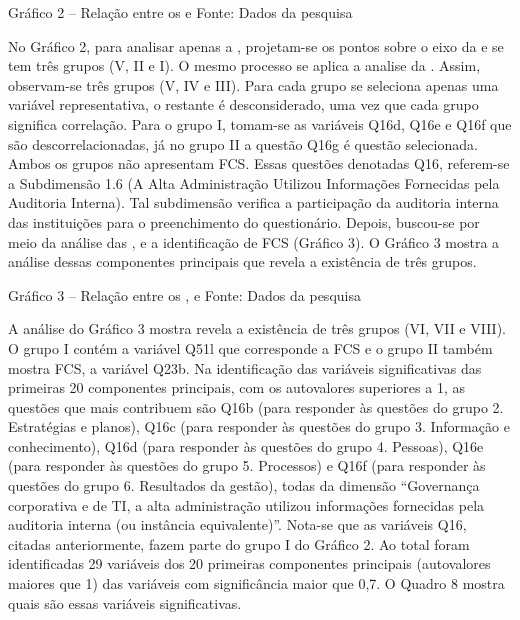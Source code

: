 Gráfico 2 – Relação entre os  e  
Fonte: Dados da pesquisa

No Gráfico 2, para analisar apenas a , projetam-se os pontos sobre o eixo da e se tem três grupos (V, II e I). O mesmo processo se aplica a analise da . Assim, observam-se três grupos (V, IV e III). Para cada grupo se seleciona apenas uma variável representativa, o restante é desconsiderado, uma vez que cada grupo significa correlação.
Para o grupo I, tomam-se as variáveis Q16d, Q16e e Q16f que são descorrelacionadas, já no grupo II a questão Q16g é questão selecionada. Ambos os grupos não apresentam FCS. Essas questões denotadas Q16, referem-se a Subdimensão 1.6 (A Alta Administração Utilizou Informações Fornecidas pela Auditoria Interna). Tal subdimensão verifica a participação da auditoria interna das instituições para o preenchimento do questionário. 
Depois, buscou-se por meio da análise das ,  e a identificação de FCS (Gráfico 3). O Gráfico 3 mostra a análise dessas componentes principais que revela a existência de três grupos. 

Gráfico 3 – Relação entre os ,  e 
Fonte: Dados da pesquisa

A análise do Gráfico 3 mostra revela a existência de três grupos (VI, VII e VIII). O grupo I contém a variável Q51l que corresponde a FCS e o grupo II também mostra FCS, a variável Q23b.
Na identificação das variáveis significativas das primeiras 20 componentes principais, com os autovalores superiores a 1, as questões que mais contribuem são Q16b (para responder às questões do grupo 2. Estratégias e planos), Q16c (para responder às questões do grupo 3. Informação e conhecimento), Q16d (para responder às questões do grupo 4. Pessoas), Q16e (para responder às questões do grupo 5. Processos) e Q16f (para responder às questões do grupo 6. Resultados da gestão), todas da dimensão “Governança corporativa e de TI, a alta administração utilizou informações fornecidas pela auditoria interna (ou instância equivalente)”. Nota-se que as variáveis Q16, citadas anteriormente, fazem parte do grupo I do Gráfico 2. Ao total foram identificadas 29 variáveis dos 20 primeiras componentes principais (autovalores maiores que 1) das variáveis com significância maior que 0,7. O Quadro 8 mostra quais são essas variáveis significativas. 

